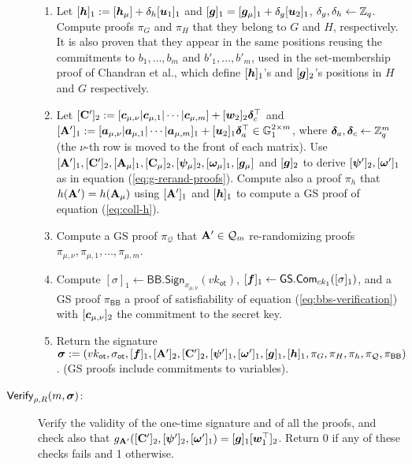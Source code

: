 \begin{description}
\begin{enumerate}
\item Let $[{\boldsymbol{h}}]_1:=[{\boldsymbol{h}}_\mu]+\delta_h[{\boldsymbol{u}}_1]_1$ and $[{\boldsymbol{g}}]_1=[{\boldsymbol{g}}_\mu]_1+\delta_g[{\boldsymbol{u}}_2]_1$, $\delta_g,\delta_h\gets\mathbb{Z}_q$. Compute proofs $\pi_G$ and $\pi_H$ that they belong to $G$ and $H$, respectively. It is also proven that they appear in the same positions reusing the commitments to $b_1,\ldots,b_{m}$ and $b'_1,\ldots,b'_{m}$, used in the set-membership proof of Chandran et al., which define $[{\boldsymbol{h}}]_1$'s and $[{\boldsymbol{g}}]_2$'s positions in $H$ and $G$ respectively.

\item Let
$
[\mathbf{{C}}']_2:=[{\boldsymbol{c}}_{\mu,\nu}|{\boldsymbol{c}}_{\mu,1}|\cdots|{\boldsymbol{c}}_{\mu,m}]+[{\boldsymbol{w}}_2]_2{\boldsymbol{\delta}}_c^\top$ and $[\mathbf{{A}}']_1:=[{\boldsymbol{a}}_{\mu,\nu} |\allowbreak {\boldsymbol{a}}_{\mu,1} | \cdots |{\boldsymbol{a}}_{\mu,m}]_1+[{\boldsymbol{u}}_2]_1{\boldsymbol{\delta}}_a^\top\in\mathbb{G}^{2\times m}_1$, where ${\boldsymbol{\delta}}_a,{\boldsymbol{\delta}}_c\gets\mathbb{Z}_q^m$ (the $\nu$-th row is moved to the front of each matrix).
Use $[\mathbf{{A}}']_1,[\mathbf{{C}}']_2,[\mathbf{{A}}_\mu]_1,[\mathbf{{C}}_\mu]_2,[{\boldsymbol{\psi}}_\mu]_2,[{\boldsymbol{\omega}}_\mu]_1,[{\boldsymbol{g}}_\mu]$ and $[{\boldsymbol{g}}]_2$ to derive $[{\boldsymbol{\psi}}']_2,[{\boldsymbol{\omega}}']_1$ as in equation (\ref{eq:g-rerand-proofs}). Compute also a proof $\pi_h$ that $h(\mathbf{{A}}')=h(\mathbf{{A}}_\mu)$ using $[\mathbf{{A}}']_1$ and $[{\boldsymbol{h}}
]_1$ to compute a GS proof of equation (\ref{eq:coll-h}).
\item Compute a GS proof $\pi_{\mathcal{Q}}$ that $\mathbf{{A}}'\in \mathcal{Q}_m$ re-randomizing proofs $\pi_{\mu,\nu},\pi_{\mu,1},\allowbreak\ldots,\pi_{\mu,m}$.

\item Compute $[\sigma]_1\gets\mathsf{BB}.\mathsf{Sign}_{x_{\mu,\nu}}(vk_\mathsf{ot})$, $[{\boldsymbol{f}}]_1\gets{\mathsf{GS}}.\mathsf{Com}_{ck_1}([\sigma]_1)$, and a GS proof $\pi_\mathsf{BB}$ a proof of satisfiability of equation (\ref{eq:bbs-verification}) with $[{\boldsymbol{c}}_{\mu,\nu}]_2$ the commitment to the secret key.

\item Return the signature ${\boldsymbol \sigma}:=(vk_\mathsf{ot},\sigma_\mathsf{ot},[{\boldsymbol{f}}]_1,[\mathbf{{A}}']_2,[\mathbf{{C}}']_2,[{\boldsymbol{\psi}}']_1,[{\boldsymbol{\omega}}']_1,[{\boldsymbol{g}}]_1,[{\boldsymbol{h}}]_1,\allowbreak\pi_G,\pi_H, \pi_h,\pi_{\mathcal{Q}},\pi_\mathsf{BB})$. (GS proofs include commitments to variables).
\end{enumerate}

\item[$\mathsf{Verify}_{\rho,R}(m,{\boldsymbol \sigma})$:] Verify the validity of the one-time signature and of all the proofs, and check also that $g_{\mathbf{{A}}'}([\mathbf{{C}}']_2,[{\boldsymbol{\psi}}']_2,[{\boldsymbol{\omega}}']_1) = [{\boldsymbol{g}}]_1[{\boldsymbol{w}}_1^\top]_2$. Return 0 if any of these checks fails and 1 otherwise.
\end{description}

